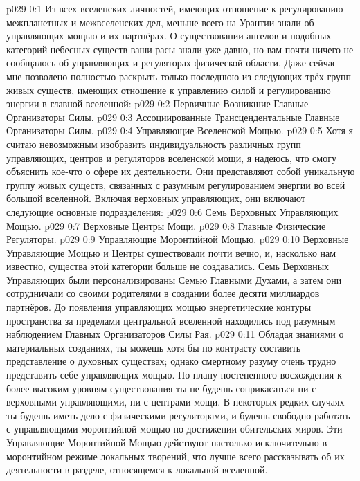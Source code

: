 \author{Всеобщий Цензор}
\vs p029 0:1 Из всех вселенских личностей, имеющих отношение к регулированию межпланетных и межвселенских дел, меньше всего на Урантии знали об управляющих мощью и их партнёрах. О существовании ангелов и подобных категорий небесных существ ваши расы знали уже давно, но вам почти ничего не сообщалось об управляющих и регуляторах физической области. Даже сейчас мне позволено полностью раскрыть только последнюю из следующих трёх групп живых существ, имеющих отношение к управлению силой и регулированию энергии в главной вселенной:
\vs p029 0:2 Первичные Возникшие Главные Организаторы Силы.
\vs p029 0:3 Ассоциированные Трансцендентальные Главные Организаторы Силы.
\vs p029 0:4 Управляющие Вселенской Мощью.
\vs p029 0:5 \pc Хотя я считаю невозможным изобразить индивидуальность различных групп управляющих, центров и регуляторов вселенской мощи, я надеюсь, что смогу объяснить кое\hyp{}что о сфере их деятельности. Они представляют собой уникальную группу живых существ, связанных с разумным регулированием энергии во всей большой вселенной. Включая верховных управляющих, они включают следующие основные подразделения:
\vs p029 0:6 Семь Верховных Управляющих Мощью.
\vs p029 0:7 Верховные Центры Мощи.
\vs p029 0:8 Главные Физические Регуляторы.
\vs p029 0:9 Управляющие Моронтийной Мощью.
\vs p029 0:10 \pc Верховные Управляющие Мощью и Центры существовали почти вечно, и, насколько нам известно, существа этой категории больше не создавались. Семь Верховных Управляющих были персонализированы Семью Главными Духами, а затем они сотрудничали со своими родителями в создании более десяти миллиардов партнёров. До появления управляющих мощью энергетические контуры пространства за пределами центральной вселенной находились под разумным наблюдением Главных Организаторов Силы Рая.
\vs p029 0:11 Обладая знаниями о материальных созданиях, ты можешь хотя бы по контрасту составить представление о духовных существах; однако смертному разуму очень трудно представить себе управляющих мощью. По плану постепенного восхождения к более высоким уровням существования ты не будешь соприкасаться ни с верховными управляющими, ни с центрами мощи. В некоторых редких случаях ты будешь иметь дело с физическими регуляторами, и будешь свободно работать с управляющими моронтийной мощью по достижении обительских миров. Эти Управляющие Моронтийной Мощью действуют настолько исключительно в моронтийном режиме локальных творений, что лучше всего рассказывать об их деятельности в разделе, относящемся к локальной вселенной.
